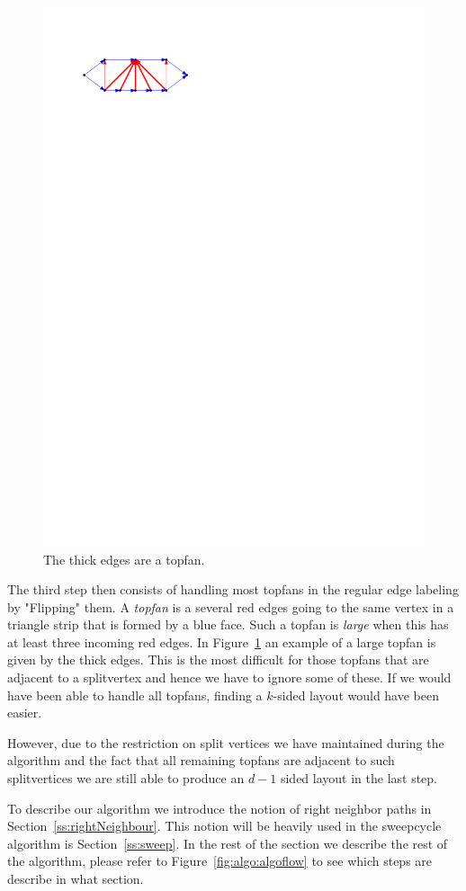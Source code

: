   \begin{figure}
    \centering
    \includegraphics[]{unifiedAlgo/img/topfanExample.pdf}
    \caption{The thick edges are a topfan.}
    \label{fig:algo:topfanExample}
  \end{figure}

  The third step then consists of handling most topfans in the regular edge labeling by "Flipping" them.
  A \emph{topfan} is a several red edges going to the same vertex in a triangle strip that is formed by a blue face.
  Such a topfan is \emph{large} when this has at least three incoming red edges.
  In Figure~\ref{fig:algo:topfanExample} an example of a large topfan is given by the thick edges.
  This is the most difficult for those topfans that are adjacent to a splitvertex and hence we have to ignore some of these.
  If we would have been able to handle all topfans, finding a $k$-sided layout would have been easier.

  However, due to the restriction on split vertices we have maintained during the algorithm and the fact that all remaining topfans are adjacent to such splitvertices we are still able to produce an $d-1$ sided layout in the last step.

  To describe our algorithm we introduce the notion of right neighbor paths in Section~\ref{ss:rightNeighbour}. This notion will be heavily used in the sweepcycle algorithm is Section~\ref{ss:sweep}. In the rest of the section we describe the rest of the algorithm, please refer to Figure~\ref{fig:algo:algoflow} to see which steps are describe in what section.
